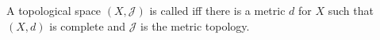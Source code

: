 A topological space $(X, \mathcal{J})$ is called  iff there is a metric $d$ for $X$ such that $(X, d)$ is complete and $\mathcal{J}$ is the metric topology.
